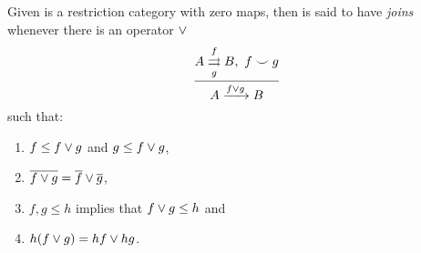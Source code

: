 \begin{definition}\label{def:joins}
  Given \R is a restriction category with zero maps, then \R is said to have
  \emph{joins}\cite{guox:thesis} whenever there is an operator $\vee$
  \[
    \infer{A\xrightarrow{f\join g} B}
      {A\overset{f}{\underset{g}{\rightrightarrows}}B,\ f\compatible g}
  \]
  such that:
  \begin{enumerate}[{(}i{)}]
    \item $f \le f \vee g$ and $g \le f \vee g$,\label{defitem:join1}
    \item $\overline{f\vee g} = \overline{f}\vee \overline{g}$,\label{defitem:join2}
    \item $f,g \le h$ implies that $f\vee g \le h$ and\label{defitem:join3}
    \item $h(f\vee g) = h f \vee h g$.\label{defitem:join4}
  \end{enumerate}
\end{definition}

